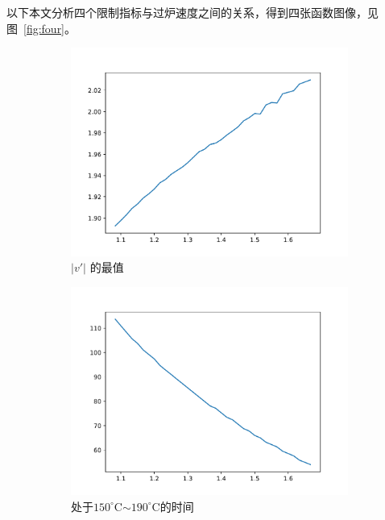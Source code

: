 \documentclass[../main.tex]{subfiles}
\begin{document}
以下本文分析四个限制指标与过炉速度之间的关系，得到四张函数图像，见图~\ref{fig:four}。
\begin{figure}[H]
\centering
\begin{subfigure}[b]{0.4\textwidth}
\centering
\includegraphics[width=\textwidth]{k.pdf}
\caption{\(\vert v' \vert\) 的最值}
\end{subfigure}
%
\begin{subfigure}[b]{0.4\textwidth}
\centering
\includegraphics[width=\textwidth]{190170.pdf}
\caption{处于\(150 ^{\circ}\mathrm{C}\)\(\sim\)\(190 ^{\circ}\mathrm{C}\)的时间}
\end{subfigure}
%
\begin{subfigure}[b]{0.4\textwidth}
\centering

\end{subfigure}
\end{figure}
\end{document}
